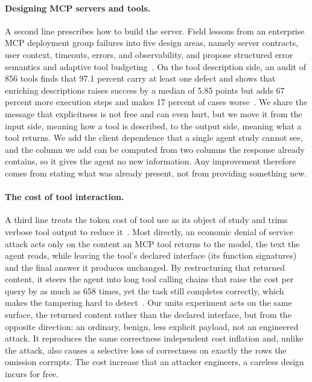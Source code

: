 \documentclass[sigconf]{ceurart}
\begin{document}
\paragraph{Designing MCP servers and tools.}
A second line prescribes how to build the server. Field lessons from an enterprise
MCP deployment group failures into five design areas, namely server contracts,
user context, timeouts, errors, and observability, and propose structured error
semantics and adaptive tool budgeting~\cite{srinivasan2026bridging}. On the tool
description side, an audit of 856 tools finds that 97.1 percent carry at least one
defect and shows that enriching descriptions raises success by a median of 5.85
points but adds 67 percent more execution steps and makes 17 percent of cases
worse~\cite{hasan2026smelly}. We share the message that explicitness is not free
and can even hurt, but we move it from the input side, meaning how a tool is
described, to the output side, meaning what a tool returns. We add the client
dependence that a single agent study cannot see, and the column we add can be
computed from two columns the response already contains, so it gives the agent no
new information. Any improvement therefore comes from stating what was already
present, not from providing something new.

\paragraph{The cost of tool interaction.}
A third line treats the token cost of tool use as its object of study and trims
verbose tool output to reduce it~\cite{xiao2026reducingcostllmagents}. Most directly, an
economic denial of service attack acts only on the content an MCP tool returns to
the model, the text the agent reads, while leaving the tool's declared interface
(its function signatures) and the final answer it produces unchanged. By
restructuring that returned content, it steers the agent into long tool calling
chains that raise the cost per query by as much as 658 times, yet the task still
completes correctly, which makes the tampering hard to
detect~\cite{zhou2026beyondmaxtokens}. Our units experiment acts on the same surface, the
returned content rather than the declared interface, but from the opposite
direction: an ordinary, benign, less explicit payload, not an engineered attack. It
reproduces the same correctness independent cost inflation and, unlike the attack,
also causes a selective loss of correctness on exactly the rows the omission
corrupts. The cost increase that an attacker engineers, a careless design incurs for
free.
\end{document}
